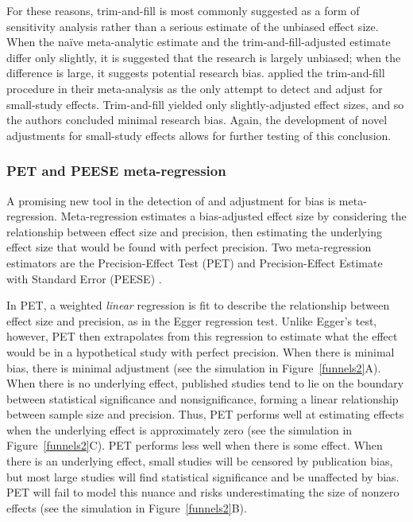 \documentclass[man, mask]{apa6}
\begin{document}
For these reasons, trim-and-fill is most commonly suggested as a form of sensitivity analysis rather than a serious estimate of the unbiased effect size. When the na{\"i}ve meta-analytic estimate and the trim-and-fill-adjusted estimate differ only slightly, it is suggested that the research is largely unbiased; when the difference is large, it suggests potential research bias.
\citet{Anderson:etal:2010} applied the trim-and-fill procedure in their meta-analysis as the only attempt to detect and adjust for small-study effects. Trim-and-fill yielded only slightly-adjusted effect sizes, and so the authors concluded minimal research bias.  %
Again, the development of novel adjustments for small-study effects allows for further testing of this conclusion.

\subsubsection{PET and PEESE meta-regression}
A promising new tool in the detection of and adjustment for bias is meta-regression. Meta-regression estimates a bias-adjusted effect size by considering the relationship between effect size and precision, then estimating the underlying effect size that would be found with perfect precision. Two meta-regression estimators are the Precision-Effect Test (PET) and Precision-Effect Estimate with Standard Error (PEESE) \citep{Stanley:Doucouliagos:2014}. %

In PET, a weighted {\em linear} regression is fit to describe the relationship between effect size and precision, as in the Egger regression test. Unlike Egger's test, however, PET then extrapolates from this regression to estimate what the effect would be in a hypothetical study with perfect precision. When there is minimal bias, there is minimal adjustment (see the simulation in Figure~\ref{funnels2}A). When there is no underlying effect, published studies tend to lie on the boundary between statistical significance and nonsignificance, forming a linear relationship between sample size and precision. Thus, PET performs well at estimating effects when the underlying effect is approximately zero (see the simulation in Figure~\ref{funnels2}C). PET performs less well when there is some effect. When there is an underlying effect, small studies will be censored by publication bias, but most large studies will find statistical significance and be unaffected by bias. PET will fail to model this nuance and risks underestimating the size of nonzero effects (see the simulation in Figure~\ref{funnels2}B).
\end{document}
